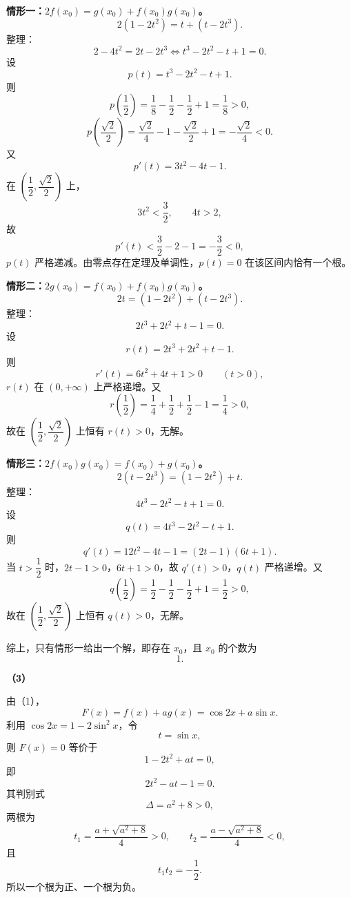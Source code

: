 \begin{answer}
\textbf{情形一：$2f(x_0)=g(x_0)+f(x_0)g(x_0)$。}
\nopagebreak[4]
\[2(1-2t^2)=t+(t-2t^3).\]
整理：
\nopagebreak[4]
\[2-4t^2=2t-2t^3
\Longleftrightarrow t^3-2t^2-t+1=0.\]
设
\nopagebreak[4]
\[p(t)=t^3-2t^2-t+1.\]
则
\nopagebreak[4]
\[p\left(\frac12\right)=\frac18-\frac12-\frac12+1=\frac18>0,\]
\nopagebreak[4]
\[p\left(\frac{\sqrt2}{2}\right)=\frac{\sqrt2}{4}-1-\frac{\sqrt2}{2}+1=-\frac{\sqrt2}{4}<0.\]
又
\nopagebreak[4]
\[p'(t)=3t^2-4t-1.\]
在 $\left(\dfrac12,\dfrac{\sqrt2}{2}\right)$ 上，
\nopagebreak[4]
\[3t^2<\frac32,\qquad4t>2,\]
故
\nopagebreak[4]
\[p'(t)<\frac32-2-1=-\frac32<0,\]
$p(t)$ 严格递减。由零点存在定理及单调性，$p(t)=0$ 在该区间内恰有一个根。

\textbf{情形二：$2g(x_0)=f(x_0)+f(x_0)g(x_0)$。}
\nopagebreak[4]
\[2t=(1-2t^2)+(t-2t^3).\]
整理：
\nopagebreak[4]
\[2t^3+2t^2+t-1=0.\]
设
\nopagebreak[4]
\[r(t)=2t^3+2t^2+t-1.\]
则
\nopagebreak[4]
\[r'(t)=6t^2+4t+1>0\qquad(t>0),\]
$r(t)$ 在 $(0,+\infty)$ 上严格递增。又
\nopagebreak[4]
\[r\left(\frac12\right)=\frac14+\frac12+\frac12-1=\frac14>0,\]
故在 $\left(\dfrac12,\dfrac{\sqrt2}{2}\right)$ 上恒有 $r(t)>0$，无解。

\textbf{情形三：$2f(x_0)g(x_0)=f(x_0)+g(x_0)$。}
\nopagebreak[4]
\[2(t-2t^3)=(1-2t^2)+t.\]
整理：
\nopagebreak[4]
\[4t^3-2t^2-t+1=0.\]
设
\nopagebreak[4]
\[q(t)=4t^3-2t^2-t+1.\]
则
\nopagebreak[4]
\[q'(t)=12t^2-4t-1=(2t-1)(6t+1).\]
当 $t>\dfrac12$ 时，$2t-1>0$，$6t+1>0$，故 $q'(t)>0$，$q(t)$ 严格递增。又
\nopagebreak[4]
\[q\left(\frac12\right)=\frac12-\frac12-\frac12+1=\frac12>0,\]
故在 $\left(\dfrac12,\dfrac{\sqrt2}{2}\right)$ 上恒有 $q(t)>0$，无解。

综上，只有情形一给出一个解，即存在 $x_0$，且 $x_0$ 的个数为
\nopagebreak[4]
\[1.\]

\textbf{（3）}

由（1），
\nopagebreak[4]
\[F(x)=f(x)+ag(x)=\cos2x+a\sin x.\]
利用 $\cos2x=1-2\sin^2x$，令
\nopagebreak[4]
\[t=\sin x,\]
则 $F(x)=0$ 等价于
\nopagebreak[4]
\[1-2t^2+at=0,\]
即
\nopagebreak[4]
\[2t^2-at-1=0.\]
其判别式
\nopagebreak[4]
\[\Delta=a^2+8>0,\]
两根为
\nopagebreak[4]
\[t_1=\frac{a+\sqrt{a^2+8}}4>0,\qquad
t_2=\frac{a-\sqrt{a^2+8}}4<0,\]
且
\nopagebreak[4]
\[t_1t_2=-\frac12.\]
所以一个根为正、一个根为负。


\end{answer}
